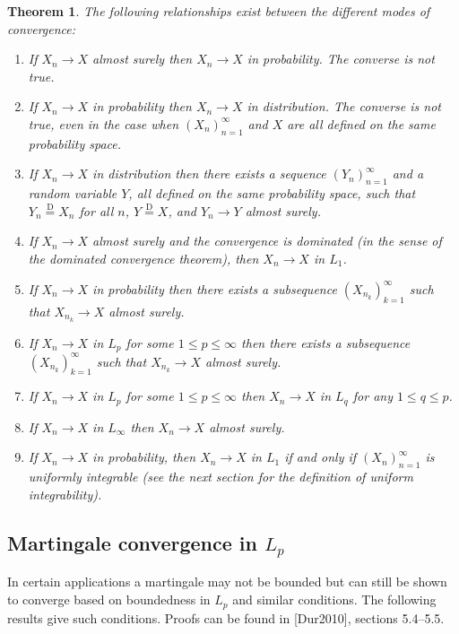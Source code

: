 \documentclass[12pt]{article}
\newtheorem{thm}{Theorem}[section]
\theoremstyle{example}
\begin{document}
\begin{thm} The following relationships exist between the different modes of convergence:
\begin{enumerate}
\item If $X_n\to X$ almost surely then $X_n\to X$ in probability. The converse is not true.
\item If $X_n\to X$ in probability then $X_n \to X$ in distribution. The converse is not true, even in the case when $(X_n)_{n=1}^\infty$ and $X$ are all defined on the same probability space.
\item If $X_n\to X$ in distribution then there exists a sequence $(Y_n)_{n=1}^\infty$ and a random variable $Y$, all defined on the same probability space, such that $Y_n \stackrel{\textrm{D}}{=} X_n$ for all $n$, $Y\stackrel{\textrm{D}}{=} X$, and $Y_n\to Y$ almost surely.
\item If $X_n\to X$ almost surely and the convergence is dominated (in the sense of the dominated convergence theorem), then $X_n\to X$ in $L_1$.
\item If $X_n\to X$ in probability then there exists a subsequence $(X_{n_k})_{k=1}^\infty$ such that $X_{n_k}\to X$ almost surely.
\item If $X_n\to X$ in $L_p$ for some $1\le p \le\infty$ then there exists a subsequence $(X_{n_k})_{k=1}^\infty$ such that $X_{n_k}\to X$ almost surely.
\item If $X_n\to X$ in $L_p$ for some $1\le p\le\infty$ then $X_n\to X$ in $L_q$ for any $1\le q\le p$.
\item If $X_n \to X$ in $L_\infty$ then $X_n\to X$ almost surely.
\item If $X_n\to X$ in probability, then $X_n\to X$ in $L_1$ if and only if $(X_n)_{n=1}^\infty$ is uniformly integrable (see the next section for the definition of uniform integrability).
\end{enumerate}

\end{thm}

\subsection{Martingale convergence in $L_p$}

In certain applications a martingale may not be bounded but can still be shown to converge based on boundedness in $L_p$ and similar conditions. The following results give such conditions. Proofs can be found in [Dur2010], sections 5.4--5.5.
\end{document}
